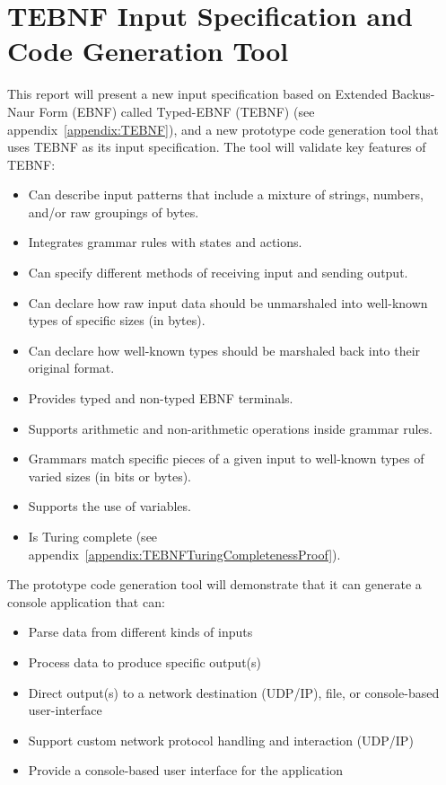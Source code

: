 \section{TEBNF Input Specification and Code Generation Tool}
This report will present a new input specification based on Extended Backus-Naur Form (EBNF) called Typed-EBNF (TEBNF) (see appendix~\ref{appendix:TEBNF}), and a new prototype code generation tool that uses TEBNF as its input specification.  The tool will validate key features of TEBNF:
\begin{itemize}
  \item Can describe input patterns that include a mixture of strings, numbers, and/or raw groupings of bytes.
  \item Integrates grammar rules with states and actions.
  \item Can specify different methods of receiving input and sending output.
  \item Can declare how raw input data should be unmarshaled into well-known types of specific sizes (in bytes).
  \item Can declare how well-known types should be marshaled back into their original format.
  \item Provides typed and non-typed EBNF terminals.
  \item Supports arithmetic and non-arithmetic operations inside grammar rules.
  \item Grammars match specific pieces of a given input to well-known types of varied sizes (in bits or bytes).
  \item Supports the use of variables.
  \item Is Turing complete (see appendix~\ref{appendix:TEBNFTuringCompletenessProof}).
\end{itemize}

\indent
The prototype code generation tool will demonstrate that it can generate a console application that can:
\begin{itemize}
  \item Parse data from different kinds of inputs
  \item Process data to produce specific output(s)
  \item Direct output(s) to a network destination (UDP/IP), file, or console-based user-interface
  \item Support custom network protocol handling and interaction (UDP/IP)
  \item Provide a console-based user interface for the application
\end{itemize}



